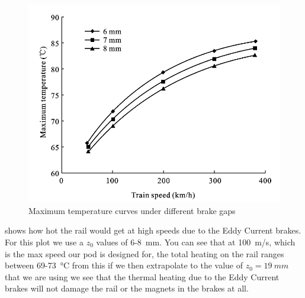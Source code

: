 \documentclass[main.tex]{subfiles}
\begin{document}
    \begin{figure}
    	\centering
        \includegraphics[width=\linewidth]{images/EC_heat}
        \caption{Maximum temperature curves under different brake gaps}
        \label{fig:ec-heat}
    \end{figure}
     shows how hot the rail would get at high speeds due to the Eddy Current brakes. For this plot we use a $z_0$ values of 6-\SI{8}{mm}. You can see that at \SI{100}{m/s}, which is the max speed our pod is designed for, the total heating on the rail ranges between 69-\SI{73}{\celsius} from this if we then extrapolate to the value of $z_0 = \SI{19}{mm}$ that we are using we see that the thermal heating due to the Eddy Current brakes will not damage the rail or the magnets in the brakes at all.
\end{document}
